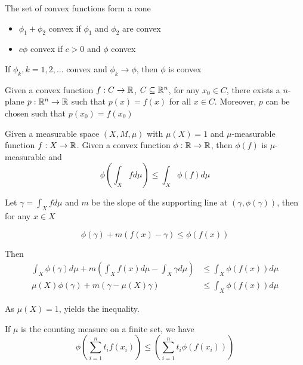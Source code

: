 \documentclass{report}
\begin{document}
\begin{proposition}
    The set of convex functions form a cone
    \begin{itemize}
        \item $\phi_1 + \phi_2$ convex if $\phi_1$ and $\phi_2$ are convex
        \item $c \phi$ convex if $c > 0$ and $\phi$ convex
    \end{itemize}
\end{proposition}

\begin{proposition}
    If $\phi_k, k=1, 2, ...$ convex and $\phi_k \to \phi$, then $\phi$ is convex
\end{proposition}

\begin{lemma}
    Given a convex function $f: C \to \mathbb{R}$, $C \subseteq \mathbb{R}^n$, for any $x_0 \in C$, there exists a $n$-plane $p: \mathbb{R}^n \to \mathbb{R}$ such that $p(x) = f(x)$ for all $x \in C$. Moreover, $p$ can be chosen such that $p(x_0) = f(x_0)$
\end{lemma}

\begin{theorem}
    Given a measurable space $(X, M, \mu)$ with $\mu(X) = 1$ and $\mu$-measurable function $f: X \to \mathbb{R}$.
    Given a convex function $\phi: \mathbb{R} \to \mathbb{R}$, then $\phi(f)$ is $\mu$-measurable and
    \[
        \phi \left( \int_X f d\mu \right) \leq \int_X \phi(f) d\mu
    \]
\end{theorem}

Let $\gamma = \int_X f d\mu$ and $m$ be the slope of the supporting line at $(\gamma, \phi(\gamma))$, then for any $x \in X$

\[
    \phi(\gamma) + m (f(x) - \gamma) \leq \phi(f(x))
\]

Then 
\begin{align*}
    \int_X \phi(\gamma) d\mu + m \left(\int_X f(x) d\mu - \int_X \gamma d\mu \right)  &\leq \int_X \phi(f(x)) d\mu \\
    \mu(X) \phi(\gamma) + m \left(\gamma - \mu(X) \gamma \right)  &\leq \int_X \phi(f(x)) d\mu
\end{align*}

As $\mu(X) = 1$, yields the inequality.

If $\mu$ is the counting measure on a finite set, we have
\[
    \phi \left( \sum_{i=1}^n t_i f(x_i) \right) \leq  \left( \sum_{i=1}^n t_i \phi(f(x_i)) \right)
\]
\end{document}
